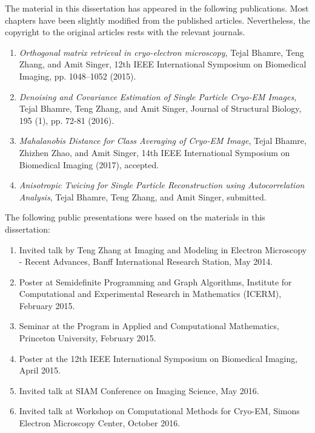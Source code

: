 
The material in this dissertation has appeared in the following publications. Most chapters have been slightly modified from the published articles. Nevertheless, the copyright to the original articles rests with the relevant journals.

\begin{enumerate}
\item \textit{Orthogonal matrix retrieval in cryo-electron microscopy}, Tejal Bhamre, Teng Zhang, and Amit Singer, 12th IEEE International Symposium on Biomedical Imaging, pp. 1048--1052 (2015).

\item \textit{Denoising and Covariance Estimation of Single Particle Cryo-EM Images}, Tejal Bhamre, Teng Zhang, and Amit Singer, Journal of Structural Biology, 195 (1), pp. 72-81 (2016).

\item \textit{Mahalanobis Distance for Class Averaging of Cryo-EM Image}, Tejal Bhamre, Zhizhen Zhao, and Amit Singer,  14th IEEE International Symposium on Biomedical Imaging (2017), accepted.

\item \textit{Anisotropic Twicing for Single Particle Reconstruction using Autocorrelation Analysis}, Tejal Bhamre, Teng Zhang, and Amit Singer, submitted. 
\end{enumerate}

The following public presentations were based on the materials in this dissertation:
\begin{enumerate}

\item Invited talk by Teng Zhang at Imaging and Modeling in Electron Microscopy - Recent Advances, Banff International Research Station, May 2014.

\item Poster at Semidefinite Programming and Graph Algorithms, Institute for Computational and Experimental Research in Mathematics (ICERM), February 2015.

\item Seminar at the Program in Applied and Computational Mathematics, Princeton University, February 2015.

\item Poster at the 12th IEEE International Symposium on Biomedical Imaging, April 2015.

\item Invited talk at SIAM Conference on Imaging Science, May 2016.

\item Invited talk at Workshop on Computational Methods for Cryo-EM, Simons Electron Microscopy Center, October 2016.

\end{enumerate}